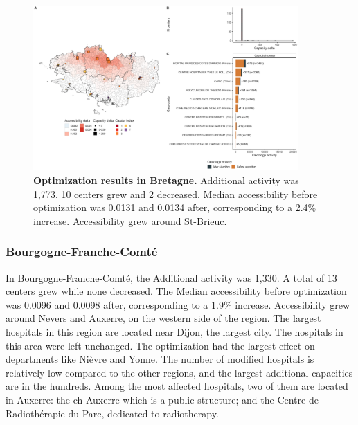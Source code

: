 \begin{figure}[h!]
    \includegraphics[width=0.9\textwidth]{images/camion/optim_region/optim_Bretagne.png}
    \centering
    \caption{ \textbf{Optimization results in Bretagne.} Additional activity was
        1,773. 10 centers grew and 2 decreased. Median accessibility before
        optimization was 0.0131 and 0.0134 after, corresponding to a 2.4\%
        increase. Accessibility grew around St-Brieuc. }
\end{figure}

\subsubsection{Bourgogne-Franche-Comté}

In Bourgogne-Franche-Comté, the Additional activity was 1,330. A total of 13
centers grew while none decreased. The Median accessibility before optimization
was 0.0096 and 0.0098 after, corresponding to a 1.9\% increase. Accessibility grew
around Nevers and Auxerre, on the western side of the region. The largest hospitals
in this region are located near Dijon, the largest city. The hospitals in this
area were left unchanged. The optimization had the largest effect on departments
like Nièvre and Yonne. The number of modified hospitals is relatively low compared
to the other regions, and the largest additional capacities are in the hundreds.
Among the most affected hospitals, two of them are located in Auxerre: the
\ac{ch} Auxerre which is a public structure; and the Centre de Radiothérapie
du Parc, dedicated to radiotherapy.

